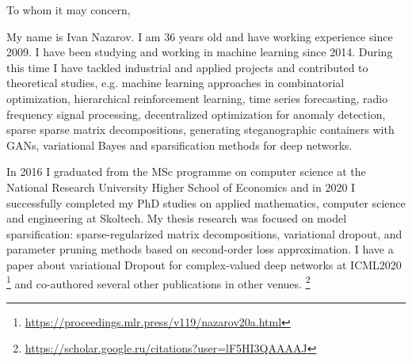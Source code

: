 \documentclass[14pt]{letter}
\begin{document}
\thispagestyle{empty}

%

\vspace{1.5cm}

\begin{minipage}{0.5\linewidth}
To whom it may concern, \par
\end{minipage} \par\bigskip

My name is Ivan Nazarov. I am {36} years old and have working experience since 2009.
I have been studying and working in machine learning since 2014. During this time I
have tackled industrial and applied projects and contributed to theoretical studies,
e.g. machine learning approaches in combinatorial optimization, hierarchical reinforcement
learning, time series forecasting, radio frequency signal processing, decentralized
optimization for anomaly detection, sparse sparse matrix decompositions, generating
steganographic containers with GANs, variational Bayes and sparsification methods
for deep networks.
\par\medskip

In 2016 I graduated from the MSc programme on computer science at the National Research
University Higher School of Economics and in 2020 I successfully completed my PhD studies
on applied mathematics, computer science and engineering at Skoltech. My thesis research
was focused on model sparsification: sparse-regularized matrix decompositions, variational
dropout, and parameter pruning methods based on second-order loss approximation. I have
a paper about variational Dropout for complex-valued deep networks at ICML2020%
\footnote{
    \url{https://proceedings.mlr.press/v119/nazarov20a.html}
} and co-authored several other publications in other venues.%
\footnote{
    \url{https://scholar.google.ru/citations?user=lF5HI3QAAAAJ}
}
\par\medskip
\end{document}
